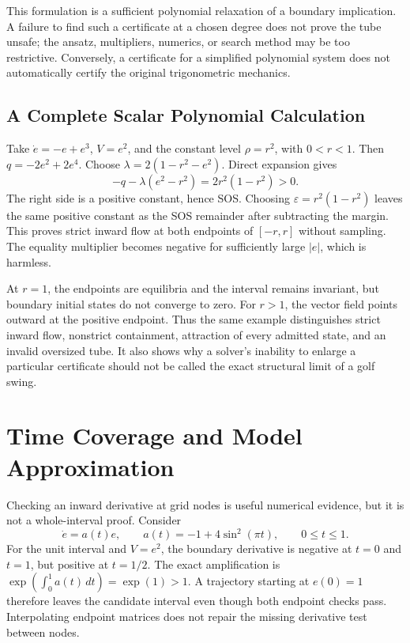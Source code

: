 \documentclass[12pt, openany]{book}
\theoremstyle{plain}
\begin{document}
This formulation is a sufficient polynomial relaxation of a boundary implication. A failure to find such a certificate at a chosen degree does not prove the tube unsafe; the ansatz, multipliers, numerics, or search method may be too restrictive. Conversely, a certificate for a simplified polynomial system does not automatically certify the original trigonometric mechanics.

\subsection{A Complete Scalar Polynomial Calculation}

Take $\dot e=-e+e^3$, $V=e^2$, and the constant level $\rho=r^2$, with $0<r<1$. Then $q=-2e^2+2e^4$. Choose $\lambda=2(1-r^2-e^2)$. Direct expansion gives
\begin{equation}
 -q-\lambda(e^2-r^2)=2r^2(1-r^2)>0.
 \label{eq:funnel_polynomial_identity}
\end{equation}
The right side is a positive constant, hence SOS. Choosing $\varepsilon=r^2(1-r^2)$ leaves the same positive constant as the SOS remainder after subtracting the margin. This proves strict inward flow at both endpoints of $[-r,r]$ without sampling. The equality multiplier becomes negative for sufficiently large $|e|$, which is harmless.

At $r=1$, the endpoints are equilibria and the interval remains invariant, but boundary initial states do not converge to zero. For $r>1$, the vector field points outward at the positive endpoint. Thus the same example distinguishes strict inward flow, nonstrict containment, attraction of every admitted state, and an invalid oversized tube. It also shows why a solver's inability to enlarge a particular certificate should not be called the exact structural limit of a golf swing.

\section{Time Coverage and Model Approximation}

Checking an inward derivative at grid nodes is useful numerical evidence, but it is not a whole-interval proof. Consider
\begin{equation}
 \dot e=a(t)e,\qquad a(t)=-1+4\sin^2(\pi t),\qquad 0\leq t\leq1.
 \label{eq:funnel_time_sampling}
\end{equation}
For the unit interval and $V=e^2$, the boundary derivative is negative at $t=0$ and $t=1$, but positive at $t=1/2$. The exact amplification is $\exp(\int_0^1a(t)\,dt)=\exp(1)>1$. A trajectory starting at $e(0)=1$ therefore leaves the candidate interval even though both endpoint checks pass. Interpolating endpoint matrices does not repair the missing derivative test between nodes.
\end{document}
